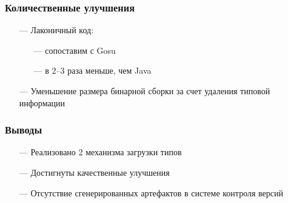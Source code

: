 \documentclass[14pt]{beamer}
\begin{document}
\begin{frame}\frametitle{Количественные улучшения}
    \begin{itemize}
        \item[---] Лаконичный код:
            \begin{itemize}
                \item[---] сопоставим с Gosu
                \item[---] в 2--3 раза меньше, чем Java
            \end{itemize}
        \item[---] Уменьшение размера бинарной сборки за счет удаления типовой информации
    \end{itemize}
\end{frame}

\begin{frame}\frametitle{Выводы}
    \begin{itemize}
        \item[---] Реализовано 2 механизма загрузки типов
        \item[---] Достигнуты качественные улучшения
        \item[---] Отсутствие сгенерированных артефактов в системе контроля версий
    \end{itemize}
\end{frame}
\end{document}
